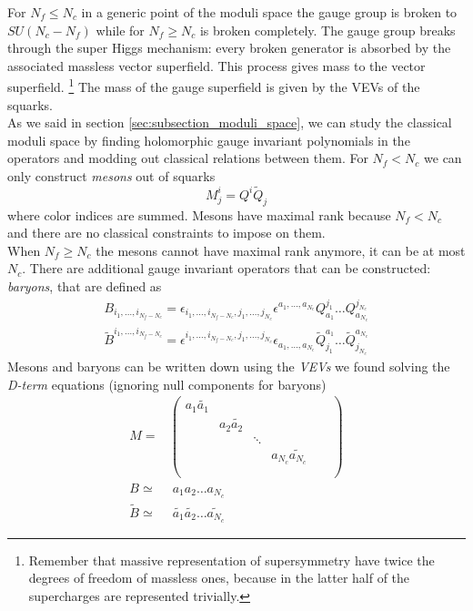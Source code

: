 For $N_f \le N_c$ in a generic point of the moduli space the gauge group is broken to $SU(N_c - N_f)$ while for $N_f \geq N_c$ is broken completely.
The gauge group breaks through the super Higgs mechanism: every broken generator is absorbed by the associated massless vector superfield.
This process gives mass to the vector superfield.  
\footnote{Remember that massive representation of supersymmetry have twice the degrees of freedom of massless ones, because in the latter half of the supercharges are represented trivially.}
The mass of the gauge superfield is given by the VEVs of the squarks.
\\
As we said in section \ref{sec:subsection_moduli_space}, we can  study the classical moduli space by finding holomorphic gauge invariant polynomials in the operators and modding out classical relations between them.
For $N_f < N_c$ we can only construct \emph{mesons} out of squarks
\begin{equation}
  M^i_j = Q^i \tilde{Q}_j
 \end{equation} 
where color indices are summed. 
Mesons have maximal rank because $N_f < N_c$ and there are no  classical constraints to impose on them. \\
When $N_f \geq N_c$ the mesons cannot have maximal rank anymore, it can be at most $N_c$.
There are additional gauge invariant operators that can be constructed: \emph{baryons}, that are defined as
\begin{align}
 B_{ i_1, \dotsc, i_{N_f - N_c}} = \epsilon_{i_1, \dotsc, i_{N_f - N_c}, j_1 ,\dotsc, j_{N_c}} \epsilon^{a_1 , \dotsc, a_{N_c}} Q^{j_1}_{a_1} \dots Q^{j_{N_c}}_{a_{N_c}}
 \\
 \tilde{B}^{ i_1, \dotsc, i_{N_f - N_c}} = \epsilon^{i_1, \dotsc, i_{N_f - N_c}, j_1 , \dotsc, j_{N_c}} \epsilon_{a_1 , \dotsc, a_{N_c}} \tilde{Q}_{j_1}^{a_1} \dots \tilde{Q}_{j_{N_c}}^{a_{N_c}}
\end{align}
Mesons and baryons can be written down using the \emph{VEVs} we found solving the \emph{D-term} equations (ignoring null components for baryons)
\begin{align}
M =& \begin{pmatrix}
a_1 \tilde{a_1} & & & & & \\
				& a_2 \tilde{a_2}	& 		&		 & & \\
				&				 	& \ddots&		& 	& \\
				&					&		& a_{N_c} \tilde{a_{N_c}} & \\
				& & & & & \\	
\end{pmatrix}
\\
B  \simeq & \;  a_1 a_2 \dots a_{N_c} 
\\
\tilde{B} \simeq & \;  \tilde{a_1} \tilde{a_2}\dots \tilde{a_{N_c}}
\end{align}
